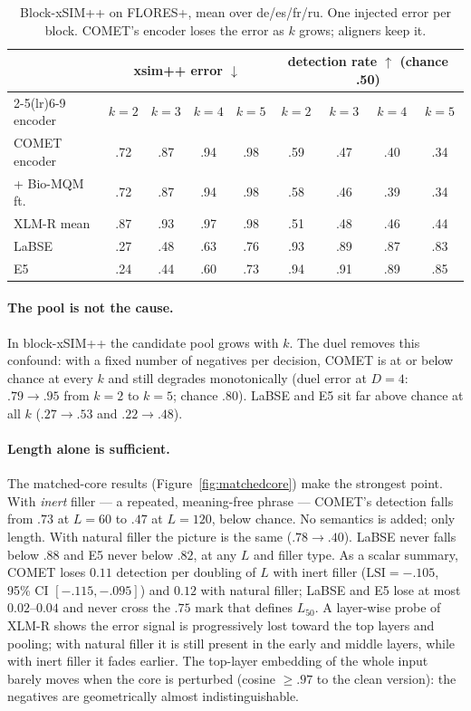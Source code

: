 \documentclass[11pt]{article}
\begin{document}
\begin{table}[t]
\centering\small
\begin{tabular}{l cccc cccc}
\toprule
& \multicolumn{4}{c}{xsim++ error $\downarrow$} & \multicolumn{4}{c}{detection rate $\uparrow$ (chance .50)}\\
\cmidrule(lr){2-5}\cmidrule(lr){6-9}
encoder & $k{=}2$ & $k{=}3$ & $k{=}4$ & $k{=}5$ & $k{=}2$ & $k{=}3$ & $k{=}4$ & $k{=}5$\\
\midrule
COMET encoder        & .72 & .87 & .94 & .98 & .59 & .47 & .40 & .34\\
\;+ Bio-MQM ft.      & .72 & .87 & .94 & .98 & .58 & .46 & .39 & .34\\
XLM-R mean           & .87 & .93 & .97 & .98 & .51 & .48 & .46 & .44\\
LaBSE                & .27 & .48 & .63 & .76 & .93 & .89 & .87 & .83\\
E5                   & .24 & .44 & .60 & .73 & .94 & .91 & .89 & .85\\
\bottomrule
\end{tabular}
\caption{Block-xSIM++ on FLORES+, mean over de/es/fr/ru. One injected error per block. COMET's encoder loses the error as $k$ grows; aligners keep it.}
\label{tab:blockxsim}
\end{table}

\paragraph{The pool is not the cause.}
In block-xSIM++ the candidate pool grows with $k$.
The duel removes this confound: with a fixed number of negatives per decision, COMET is at or below chance at every $k$ and still degrades monotonically (duel error at $D{=}4$: $.79 \to .95$ from $k{=}2$ to $k{=}5$; chance $.80$).
LaBSE and E5 sit far above chance at all $k$ ($.27 \to .53$ and $.22 \to .48$).

\paragraph{Length alone is sufficient.}
The matched-core results (Figure~\ref{fig:matchedcore}) make the strongest point.
With \emph{inert} filler --- a repeated, meaning-free phrase --- COMET's detection falls from $.73$ at $L{=}60$ to $.47$ at $L{=}120$, below chance.
No semantics is added; only length.
With natural filler the picture is the same ($.78 \to .40$).
LaBSE never falls below $.88$ and E5 never below $.82$, at any $L$ and filler type.
As a scalar summary, COMET loses $0.11$ detection per doubling of $L$ with inert filler ($\mathrm{LSI} = -.105$, 95\% CI $[-.115, -.095]$) and $0.12$ with natural filler; LaBSE and E5 lose at most $0.02$--$0.04$ and never cross the $.75$ mark that defines $L_{50}$.
A layer-wise probe of XLM-R shows the error signal is progressively lost toward the top layers and pooling; with natural filler it is still present in the early and middle layers, while with inert filler it fades earlier.
The top-layer embedding of the whole input barely moves when the core is perturbed (cosine $\ge .97$ to the clean version): the negatives are geometrically almost indistinguishable.
\end{document}

